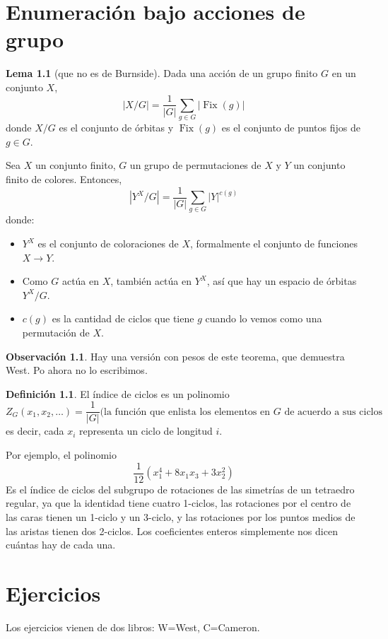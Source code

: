 \documentclass[spanish]{book}
\theoremstyle{definition}
\newtheorem*{defn}{Definición}
\newtheorem*{lema}{Lema}
\newtheorem*{obs}{Observación}
\DeclareMathOperator{\Fix}{Fix}
\begin{document}
\chapter{Enumeración bajo acciones de grupo}
\begin{lema}[que no es de Burnside]
	Dada una acción de un grupo finito $G$ en un conjunto $X$,
	\[|X/G|=\frac{1}{|G|}\sum_{g\in G}|\Fix(g)|\]
	donde $X/G$ es el conjunto de órbitas y $\Fix(g)$ es el conjunto de puntos fijos de $g\in G$.
\end{lema}
\begin{teo}
	Sea $X$ un conjunto finito, $G$ un grupo de permutaciones de $X$ y $Y$ un conjunto finito de colores. Entonces,
	\[|Y^X/G|=\frac{1}{|G|}\sum_{g\in G}|Y|^{c(g)}\]
	donde:
	\begin{itemize}
		\item $Y^X$ es el conjunto de coloraciones de $X$, formalmente el conjunto de funciones $X\to Y$.
		\item Como $G$ actúa en $X$, también actúa en $Y^X$, así que hay un espacio de órbitas $Y^X/G$.
		\item $c(g)$ es la cantidad de ciclos que tiene $g$ cuando lo vemos como una permutación de $X$.
	\end{itemize}
\end{teo}
\begin{obs}
	Hay una versión con pesos de este teorema, que demuestra West. Po ahora no lo escribimos.
\end{obs}
\begin{defn}
	El índice de ciclos es un polinomio
	\[Z_G(x_1,x_2,\ldots)=\frac{1}{|G|}(\text{la función que enlista los elementos en }G\text{ de acuerdo a sus ciclos}\]
	es decir, cada $x_i$ representa un ciclo de longitud $i$.
\end{defn}
Por ejemplo, el polinomio
\[\frac{1}{12}(x^4_1+8x_1x_3+3x^2_2)\]
Es el índice de ciclos del subgrupo de rotaciones de las simetrías de un tetraedro regular, ya que la identidad tiene cuatro 1-ciclos, las rotaciones por el centro de las caras tienen un 1-ciclo y un 3-ciclo, y las rotaciones por los puntos medios de las aristas tienen dos 2-ciclos. Los coeficientes enteros simplemente nos dicen cuántas hay de cada una.

\chapter{Ejercicios}
Los ejercicios vienen de dos libros: W=West, C=Cameron.
\end{document}
